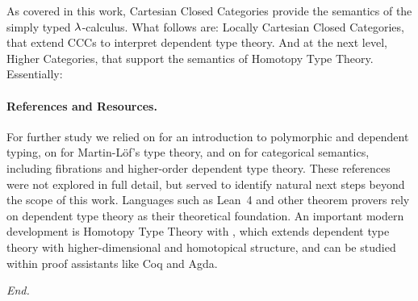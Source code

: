 As covered in this work, Cartesian Closed Categories provide the semantics of the simply typed $\lambda$-calculus. What follows are: Locally Cartesian Closed Categories, that extend CCCs to interpret dependent type theory. And at the next level, Higher Categories, that support the semantics of Homotopy Type Theory. Essentially:

\begin{center}
\end{center}

\paragraph{References and Resources. }{
  For further study we relied on \cite{nederpelt2014:type-theory} for an introduction to polymorphic and dependent typing, on \cite{nordstrom1990programming} for Martin-Löf's type theory, and on \cite{Jacobs1999categorical} for categorical semantics, including fibrations and higher-order dependent type theory. These references were not explored in full detail, but served to identify natural next steps beyond the scope of this work. Languages such as Lean~4 and other theorem provers rely on dependent type theory as their theoretical foundation. An important modern development is Homotopy Type Theory with \cite{hottbook2013}, which extends dependent type theory with higher-dimensional and homotopical structure, and can be studied within proof assistants like Coq and Agda.
}


\vfill

\centering \Large{\textit{End.}}

\vfill


